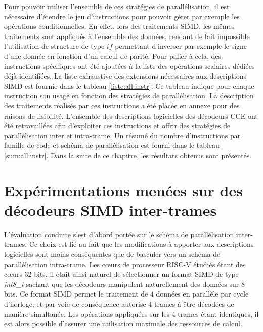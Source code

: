 \documentclass[../main.tex]{subfiles}
\begin{document}
Pour pouvoir utiliser l'ensemble de ces stratégies de parallélisation, il est nécessaire d'étendre le jeu d'instructions pour pouvoir gérer par exemple les opérations conditionnelles. 
En effet, lors des traitements SIMD, les mêmes traitements sont appliqués à l'ensemble des données, rendant de fait impossible l'utilisation de structure de type $if$ permettant d'inverser par exemple le signe d'une donnée en fonction d'un calcul de parité. 
Pour palier à cela, des instructions spécifiques ont été ajoutées à la liste des opérations scalaires dédiées déjà identifiées. 
La liste exhaustive des extensions nécessaires aux descriptions SIMD est fournie dans le tableau \ref{liste:all:instr}.
Ce tableau indique pour chaque instruction son usage en fonction des stratégies de parallélisation. 
La description des traitements réalisés par ces instructions a été placée en annexe pour des raisons de lisibilité. 
L'ensemble des descriptions logicielles des décodeurs CCE ont été retravaillées afin d'exploiter ces instructions et offrir des stratégies de parallélisation inter et intra-trame. 
Un résumé du nombre d'instructions par famille de code et schéma de parallélisation est fourni dans le tableau \ref{sum:all:instr}. 
Dans la suite de ce chapitre, les résultats obtenus sont présentés.

% 
% 
% 
% 
% 
\section{Expérimentations menées sur des décodeurs SIMD inter-trames}
% 
% 
% 
% 
% 

L'évaluation conduite s'est d'abord portée sur le schéma de parallélisation inter-trames. 
Ce choix est lié au fait que les modifications à apporter aux descriptions logicielles sont moins conséquentes que de basculer vers un schéma de parallélisation intra-trame.
Les cœurs de processeur RISC-V étudiés étant des cœurs 32 bits, il était ainsi naturel de sélectionner un format SIMD de type \textit{int8\_t } sachant que les décodeurs manipulent naturellement des données sur 8 bits. 
Ce format SIMD permet le traitement de 4 données en parallèle par cycle d'horloge, et par voie de conséquence autorise 4 trames à être décodées de manière simultanée. 
Les opérations appliquées sur les 4 trames étant identiques, il est alors possible d'assurer une utilisation maximale des ressources de calcul.
\end{document}

